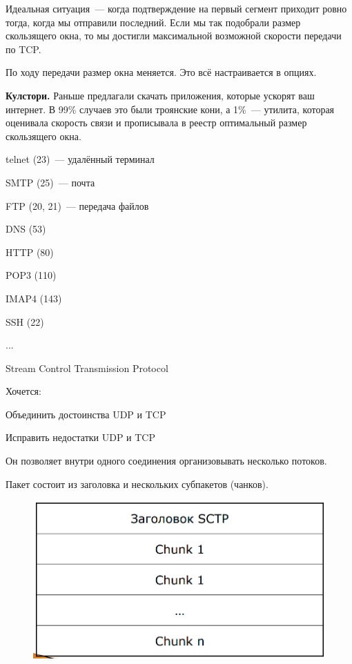 Идеальная ситуация~--- когда подтверждение на первый сегмент приходит ровно тогда, когда мы отправили последний. Если мы так подобрали размер скользящего окна, то мы достигли максимальной возможной скорости передачи по TCP.

По ходу передачи размер окна меняется. Это всё настраивается в опциях.

{\bf Кулстори.} Раньше предлагали скачать приложения, которые ускорят ваш интернет. В 99\% случаев это были троянские кони, а 1\%~--- утилита, которая оценивала скорость связи и прописывала в реестр оптимальный размер скользящего окна.


\begin{MyItemize}
    \item telnet (23)~--- удалённый терминал
    \item SMTP (25)~--- почта
    \item FTP (20, 21)~--- передача файлов
    \item DNS (53)
    \item HTTP (80)
    \item POP3 (110)
    \item IMAP4 (143)
    \item SSH (22)
    \item ...
\end{MyItemize}


Stream Control Transmission Protocol

Хочется:
\begin{MyItemize}
    \item Объединить достоинства UDP и TCP
    \item Исправить недостатки UDP и TCP
\end{MyItemize}

Он позволяет внутри одного соединения организовывать несколько потоков.

Пакет состоит из заголовка и нескольких субпакетов (чанков).

\begin{figure}[H]
  \centering
  \includegraphics[width=15cm]{images/03/07}
\end{figure}

